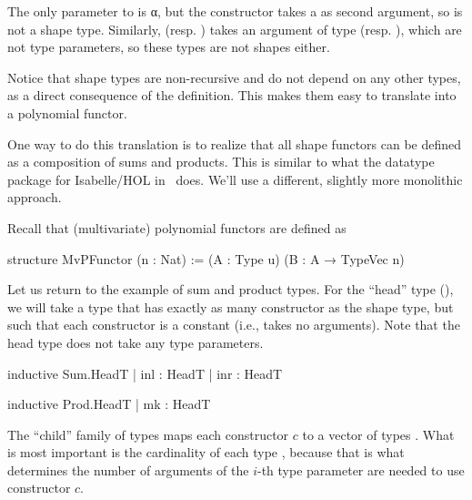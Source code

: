 The only parameter to  is α, but the  constructor takes a  as second argument,
so  is not a shape type.
Similarly,  (resp. ) takes an argument of type  (resp. ),
which are not type parameters, so these types are not shapes either.

Notice that shape types are non-recursive and do not depend on any other types, as a direct consequence 
of the definition. This makes them easy to translate into a polynomial functor. 

\begin{remark}
    One way to do this translation is to realize that all shape functors can be defined as a
    composition of sums and products. 
    This is similar to what the datatype package for Isabelle/HOL in~\cite{traytelCategoryTheoryBased} does.
    We'll use a different, slightly more monolithic approach.
\end{remark}

Recall that (multivariate) polynomial functors are defined as
\begin{leancode}
    structure MvPFunctor (n : Nat) :=
      (A : Type u) (B : A → TypeVec n)
\end{leancode}


Let us return to the example of sum and product types. 
For the ``head'' type (), we will take a type that has exactly as many constructor as
the shape type, but such that each constructor is a constant (i.e., takes no arguments).
Note that the head type does not take any type parameters. 

\begin{center}
    \begin{minipage}[t]{0.45\linewidth}
        \begin{leancode}
    inductive Sum.HeadT
      | inl : HeadT
      | inr : HeadT
        \end{leancode}
    \end{minipage}
    \begin{minipage}[t]{0.45\linewidth}
        \begin{leancode}    
    inductive Prod.HeadT
      | mk : HeadT
        \end{leancode}
    \end{minipage}
\end{center}

The ``child'' family of types maps each constructor $c$ to a vector of types .
What is most important is the cardinality of each type , 
because that is what determines the number of arguments of the $i$-th type parameter are needed
to use constructor $c$. 

